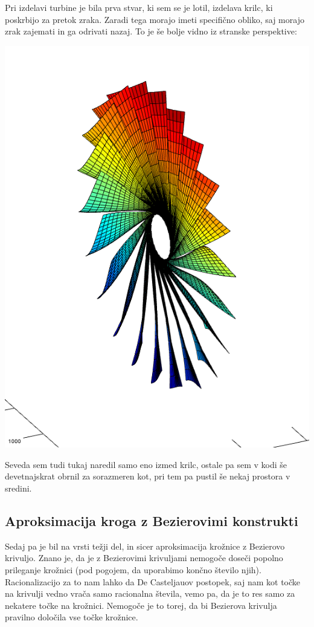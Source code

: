 \documentclass[a4paper,11pt]{article}
\begin{document}
	Pri izdelavi turbine je bila prva stvar, ki sem se je lotil, izdelava krilc, ki poskrbijo za pretok zraka. Zaradi tega morajo imeti specifično obliko, saj morajo zrak zajemati in ga odrivati nazaj. To je še bolje vidno iz stranske perspektive:
	
	\includegraphics[scale=0.45]{krilca v turbini 2}
	
	Seveda sem tudi tukaj naredil samo eno izmed krilc, ostale pa sem v kodi še devetnajskrat obrnil za sorazmeren kot, pri tem pa pustil še nekaj prostora v sredini.

	
	\subsection{Aproksimacija kroga z Bezierovimi konstrukti}
	
	Sedaj pa je bil na vrsti težji del, in sicer aproksimacija krožnice z Bezierovo krivuljo. Znano je, da je z Bezierovimi krivuljami nemogoče doseči popolno prileganje krožnici (pod pogojem, da uporabimo končno število njih). Racionalizacijo za to nam lahko da De Casteljauov postopek, saj nam kot točke na krivulji vedno vrača samo racionalna števila, vemo pa, da je to res samo za nekatere točke na krožnici. Nemogoče je to torej, da bi Bezierova krivulja pravilno določila vse točke krožnice.
	
\end{document}
